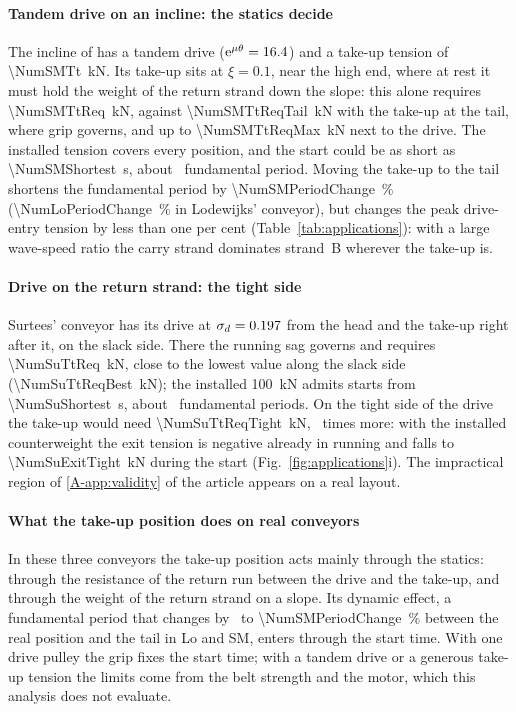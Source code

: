 \paragraph{Tandem drive on an incline: the statics decide} The incline of
\citet{suchorab2025longdistance} has a tandem drive ($\mathrm{e}^{\mu\theta}=16.4$) and a take-up
tension of \qty{\NumSMTt}{\kilo\newton}. Its take-up sits at $\xi=0.1$, near the high end, where
at rest it must hold the weight of the return strand down the slope: this alone requires
\qty{\NumSMTtReq}{\kilo\newton}, against \qty{\NumSMTtReqTail}{\kilo\newton} with the take-up at
the tail, where grip governs, and up to \qty{\NumSMTtReqMax}{\kilo\newton} next to the drive. The
installed tension covers every position, and the start could be as short as
\qty{\NumSMShortest}{\second}, about \NumSMShortestOverPeriod\ fundamental period. Moving the
take-up to the tail shortens the fundamental period by \qty{\NumSMPeriodChange}{\percent}
(\qty{\NumLoPeriodChange}{\percent} in Lodewijks' conveyor), but changes the peak drive-entry
tension by less than one per cent (Table~\ref{tab:applications}): with a large wave-speed ratio
the carry strand dominates strand~B wherever the take-up is.

\paragraph{Drive on the return strand: the tight side} Surtees' conveyor has its drive at
$\sigma_d=0.197$ from the head and the take-up right after it, on the slack side. There
the running sag governs and requires \qty{\NumSuTtReq}{\kilo\newton}, close to the lowest value
along the slack side (\qty{\NumSuTtReqBest}{\kilo\newton}); the installed
\qty{100}{\kilo\newton} admits starts from \qty{\NumSuShortest}{\second}, about
\NumSuShortestOverPeriod\ fundamental periods. On the tight side of the drive the take-up would
need \qty{\NumSuTtReqTight}{\kilo\newton}, \NumSuTightFactor\ times more: with the installed
counterweight the exit tension is negative already in running and falls to
\qty{\NumSuExitTight}{\kilo\newton} during the start (Fig.~\ref{fig:applications}i). The
impractical region of \ref{A-app:validity} of the article appears on a real layout.

\paragraph{What the take-up position does on real conveyors} In these three conveyors the take-up
position acts mainly through the statics: through the resistance of the return run between the
drive and the take-up, and through the weight of the return strand on a slope. Its dynamic
effect, a fundamental period that changes by \NumLoPeriodChange\ to
\qty{\NumSMPeriodChange}{\percent} between the real position and the tail in Lo and SM, enters
through the start time. With one drive pulley the grip fixes the start time; with a tandem drive or a
generous take-up tension the limits come from the belt strength and the motor, which this
analysis does not evaluate.
